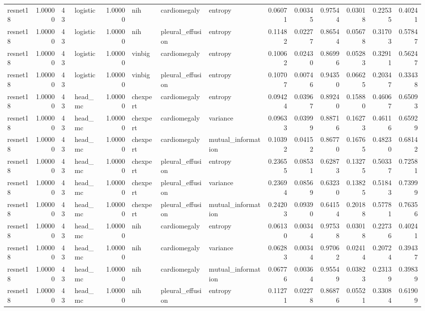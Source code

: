 \begin{tabular}{lrllrlllrrrrrr}
resnet18 & 1.00000 & 43 & logistic & 1.00000 & nih & cardiomegaly & entropy & 0.06071 & 0.00345 & 0.97544 & 0.03018 & 0.22535 & 0.40241 \\
resnet18 & 1.00000 & 43 & logistic & 1.00000 & nih & pleural\_effusion & entropy & 0.11482 & 0.02277 & 0.86544 & 0.05678 & 0.31703 & 0.57847 \\
resnet18 & 1.00000 & 43 & logistic & 1.00000 & vinbig & cardiomegaly & entropy & 0.10062 & 0.02430 & 0.86996 & 0.05283 & 0.32911 & 0.56247 \\
resnet18 & 1.00000 & 43 & logistic & 1.00000 & vinbig & pleural\_effusion & entropy & 0.10707 & 0.00746 & 0.94350 & 0.06625 & 0.20347 & 0.33438 \\
resnet18 & 1.00000 & 43 & head\_mc & 1.00000 & chexpert & cardiomegaly & entropy & 0.09424 & 0.03967 & 0.89240 & 0.15880 & 0.46067 & 0.65093 \\
resnet18 & 1.00000 & 43 & head\_mc & 1.00000 & chexpert & cardiomegaly & variance & 0.09633 & 0.03999 & 0.88716 & 0.16273 & 0.46116 & 0.65929 \\
resnet18 & 1.00000 & 43 & head\_mc & 1.00000 & chexpert & cardiomegaly & mutual\_information & 0.10392 & 0.04152 & 0.86770 & 0.16765 & 0.48230 & 0.68142 \\
resnet18 & 1.00000 & 43 & head\_mc & 1.00000 & chexpert & pleural\_effusion & entropy & 0.23655 & 0.08531 & 0.62873 & 0.13275 & 0.50337 & 0.72581 \\
resnet18 & 1.00000 & 43 & head\_mc & 1.00000 & chexpert & pleural\_effusion & variance & 0.23694 & 0.08569 & 0.63230 & 0.13825 & 0.51843 & 0.73999 \\
resnet18 & 1.00000 & 43 & head\_mc & 1.00000 & chexpert & pleural\_effusion & mutual\_information & 0.24203 & 0.09390 & 0.64154 & 0.20188 & 0.57781 & 0.76356 \\
resnet18 & 1.00000 & 43 & head\_mc & 1.00000 & nih & cardiomegaly & entropy & 0.06130 & 0.00344 & 0.97538 & 0.03018 & 0.22736 & 0.40241 \\
resnet18 & 1.00000 & 43 & head\_mc & 1.00000 & nih & cardiomegaly & variance & 0.06283 & 0.00344 & 0.97062 & 0.02414 & 0.20724 & 0.39437 \\
resnet18 & 1.00000 & 43 & head\_mc & 1.00000 & nih & cardiomegaly & mutual\_information & 0.06776 & 0.00364 & 0.95549 & 0.03823 & 0.23139 & 0.39839 \\
resnet18 & 1.00000 & 43 & head\_mc & 1.00000 & nih & pleural\_effusion & entropy & 0.11271 & 0.02278 & 0.86876 & 0.05521 & 0.33084 & 0.61909 \\

\end{tabular}
